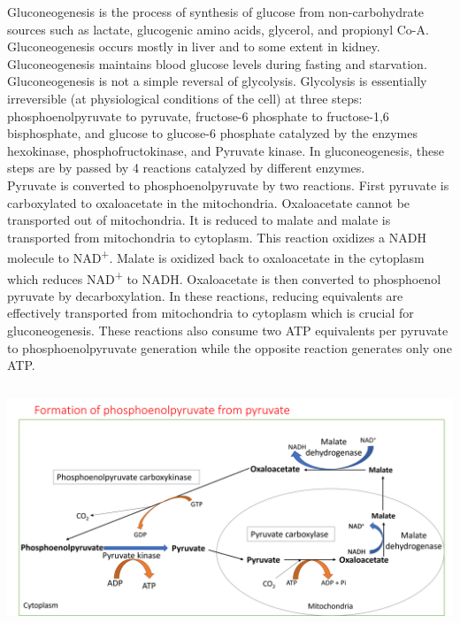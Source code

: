 \documentclass[
]{book}
\begin{document}
Gluconeogenesis is the process of synthesis of glucose from non-carbohydrate sources such as lactate, glucogenic amino acids, glycerol, and propionyl Co-A. Gluconeogenesis occurs mostly in liver and to some extent in kidney. Gluconeogenesis maintains blood glucose levels during fasting and starvation.\\

Gluconeogenesis is not a simple reversal of glycolysis. Glycolysis is essentially irreversible (at physiological conditions of the cell) at three steps: phosphoenolpyruvate to pyruvate, fructose-6 phosphate to fructose-1,6 bisphosphate, and glucose to glucose-6 phosphate catalyzed by the enzymes hexokinase, phosphofructokinase, and Pyruvate kinase. In gluconeogenesis, these steps are by passed by 4 reactions catalyzed by different enzymes.\\

Pyruvate is converted to phosphoenolpyruvate by two reactions. First pyruvate is carboxylated to oxaloacetate in the mitochondria. Oxaloacetate cannot be transported out of mitochondria. It is reduced to malate and malate is transported from mitochondria to cytoplasm. This reaction oxidizes a NADH molecule to NAD\textsuperscript{+}. Malate is oxidized back to oxaloacetate in the cytoplasm which reduces NAD\textsuperscript{+} to NADH. Oxaloacetate is then converted to phosphoenol pyruvate by decarboxylation. In these reactions, reducing equivalents are effectively transported from mitochondria to cytoplasm which is crucial for gluconeogenesis. These reactions also consume two ATP equivalents per pyruvate to phosphoenolpyruvate generation while the opposite reaction generates only one ATP.\\

\includegraphics[width=\textwidth,height=3.125in]{Images/pep.png}
\end{document}
